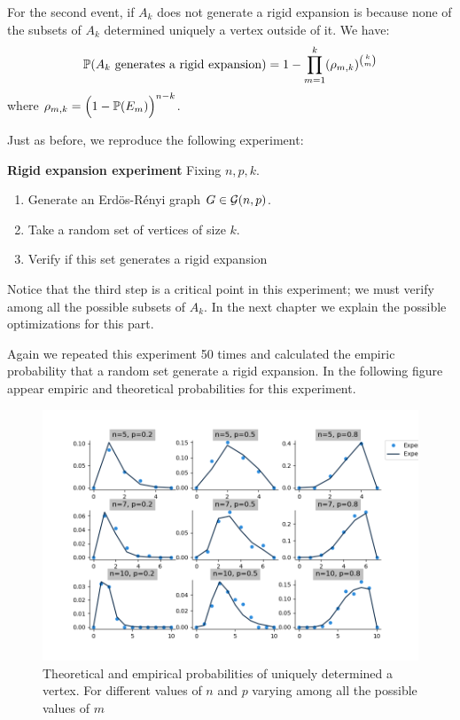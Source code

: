 For the second event, if $A_k$ does not generate a rigid expansion is because none of the subsets of $A_{k}$ determined uniquely a vertex outside of it. We have:
$$\P(A_k \text{ generates a rigid expansion}) = 1 -  \prod_{m=1}^{k} (\rho_{m,k})^{\binom{k}{m}}  $$
where $\rho_{m,k} = \Big(1 -  \P(E_m)\Big)^{n-k}$.

Just as before, we reproduce the following experiment:
 
\begin{cajita}
\textbf{Rigid expansion experiment} \hfill \break
Fixing $n,p,k$.
\begin{enumerate}
\item Generate an Erdös-Rényi graph $G\in \G(n,p)$.
\item Take a random set of vertices of size $k$.
\item Verify if this set generates a rigid expansion
\end{enumerate}
\end{cajita}

Notice that the third step is a critical point in this experiment; we must verify among all the possible subsets of $A_{k}$. In the next chapter we explain the possible optimizations for this part.

Again we repeated this experiment 50 times and calculated the empiric probability that a random set generate a rigid expansion. In the following figure appear empiric and theoretical probabilities for this experiment.

\begin{figure}[h!]
	\centering
	\includegraphics[scale=0.55]{Python/Figures/Uniquely-determinated-fixed-vertex.png}
	\caption{Theoretical and empirical probabilities of uniquely determined a vertex. For different values of $n$ and $p$ varying among all the possible values of $m$}
\end{figure}

